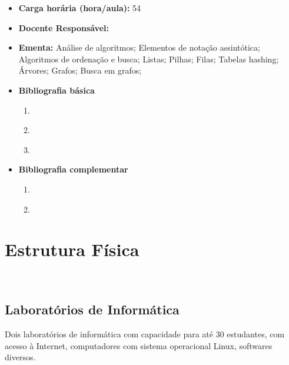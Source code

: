 \documentclass[11pt,fleqn]{book} %
\begin{document}
\begin{itemize}
	\item \textbf{Carga horária (hora/aula):} 54
	\item \textbf{Docente Responsável:}~
	\item \textbf{Ementa:} 
	Análise de algoritmos; 
	Elementos de notação assintótica;
	Algoritmos de ordenação e busca;
	Listas;
	Pilhas;
	Filas;
	Tabelas hashing;
	Árvores;
	Grafos;
	Busca em grafos;	
	\item \textbf{Bibliografia básica}
	\begin{enumerate}
		\item \cite{ascencio2010estruturas}
		\item \cite{cormen2002algoritmos}
		\item \cite{silva2007estrutura}
	\end{enumerate}
	\item \textbf{Bibliografia complementar}
	\begin{enumerate}
		\item \cite{szwarcfiter1994estruturas}	
		\item \cite{lafore2004estruturas}	
	\end{enumerate}	
\end{itemize}



\chapter{Estrutura Física}\label{estrutura}
\vspace{6em}
\begin{flushright}
	\textit{\textcolor{white}{Um bonita citação...}}
\end{flushright}
\vspace{12em}

\section{Laboratórios de Informática}
Dois laboratórios de informática com capacidade para até 30 estudantes, com acesso à Internet, computadores com sistema operacional Linux, softwares diversos.
\end{document}
